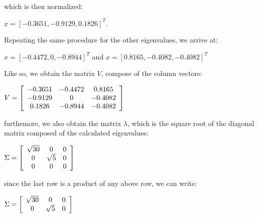 \documentclass[]{article}
\begin{document}
which is then normalized: 

\vspace{0.5em}

\centerline {
	$x = [-0.3651, -0.9129, 0.1826]^T$.
}

\vspace{0.5em}

Repeating the same procedure for the other eigenvalues, we arrive at: 

\vspace{0.5em}

\centerline {
	$x = [-0.4472, 0, -0.8944]^T$ and $x = [0.8165, -0.4082, -0.4082]^T$
}

\vspace{0.5em}

Like so, we obtain the matrix $V$, compose of the column vectors: 

\vspace{0.5em}

\centerline{ $V = \left[ {\begin{array}{*{20}c}
		-0.3651 & -0.4472 & 0.8165 \\
		-0.9129 & 0 & -0.4082 \\ 
		0.1826 & -0.8944 & -0.4082   
		\end{array} } \right]$ 
}

\vspace{0.5em}
	
furthemore, we also obtain the matrix $\lambda$, which is the square root of the diagonal matrix composed of the calculated eigenvalues: 

\vspace{0.5em}

\centerline{ $\Sigma = \left[ {\begin{array}{*{20}c}
		\sqrt{30} & 0 & 0 \\
		0 & \sqrt{5} & 0 \\ 
		0 & 0 & 0   
		\end{array} } \right]$ 
}

\vspace{0.5em}

since the last row is a product of any above row, we can write:

\vspace{0.5em}

\centerline{ $\Sigma = \left[ {\begin{array}{*{20}c}
		\sqrt{30} & 0 & 0 \\
		0 & \sqrt{5} & 0   
		\end{array} } \right]$ 
}
\end{document}
